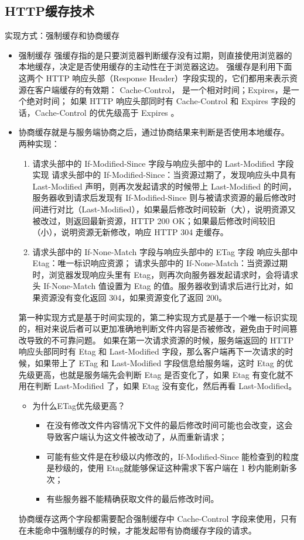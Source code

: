 \documentclass[11pt]{article}
\begin{document}
\subsection{HTTP缓存技术}
\label{sec:org2401424}
实现方式：强制缓存和协商缓存
\begin{itemize}
\item 强制缓存
强缓存指的是只要浏览器判断缓存没有过期，则直接使用浏览器的本地缓存，决定是否使用缓存的主动性在于浏览器这边。
强缓存是利用下面这两个 HTTP 响应头部（Response Header）字段实现的，它们都用来表示资源在客户端缓存的有效期：
Cache-Control， 是一个相对时间；Expires，是一个绝对时间；
如果 HTTP 响应头部同时有 Cache-Control 和 Expires 字段的话，Cache-Control 的优先级高于 Expires 。

\item 协商缓存就是与服务端协商之后，通过协商结果来判断是否使用本地缓存。
两种实现：
\begin{enumerate}
\item 请求头部中的 If-Modified-Since 字段与响应头部中的 Last-Modified 字段实现
请求头部中的 If-Modified-Since：当资源过期了，发现响应头中具有 Last-Modified 声明，则再次发起请求的时候带上 Last-Modified 的时间，服务器收到请求后发现有 If-Modified-Since 则与被请求资源的最后修改时间进行对比（Last-Modified），如果最后修改时间较新（大），说明资源又被改过，则返回最新资源，HTTP 200 OK；如果最后修改时间较旧（小），说明资源无新修改，响应 HTTP 304 走缓存。

\item 请求头部中的 If-None-Match 字段与响应头部中的 ETag 字段
响应头部中 Etag：唯一标识响应资源；
请求头部中的 If-None-Match：当资源过期时，浏览器发现响应头里有 Etag，则再次向服务器发起请求时，会将请求头 If-None-Match 值设置为 Etag 的值。服务器收到请求后进行比对，如果资源没有变化返回 304，如果资源变化了返回 200。
\end{enumerate}
第一种实现方式是基于时间实现的，第二种实现方式是基于一个唯一标识实现的，相对来说后者可以更加准确地判断文件内容是否被修改，避免由于时间篡改导致的不可靠问题。
如果在第一次请求资源的时候，服务端返回的 HTTP 响应头部同时有 Etag 和 Last-Modified 字段，那么客户端再下一次请求的时候，如果带上了 ETag 和 Last-Modified 字段信息给服务端，这时 Etag 的优先级更高，也就是服务端先会判断 Etag 是否变化了，如果 Etag 有变化就不用在判断 Last-Modified 了，如果 Etag 没有变化，然后再看 Last-Modified。
\begin{itemize}
\item 为什么ETag优先级更高？
\begin{itemize}
\item 在没有修改文件内容情况下文件的最后修改时间可能也会改变，这会导致客户端认为这文件被改动了，从而重新请求；
\item 可能有些文件是在秒级以内修改的，If-Modified-Since 能检查到的粒度是秒级的，使用 Etag就能够保证这种需求下客户端在 1 秒内能刷新多次；
\item 有些服务器不能精确获取文件的最后修改时间。
\end{itemize}
\end{itemize}
协商缓存这两个字段都需要配合强制缓存中 Cache-Control 字段来使用，只有在未能命中强制缓存的时候，才能发起带有协商缓存字段的请求。


\end{itemize}
\end{document}
